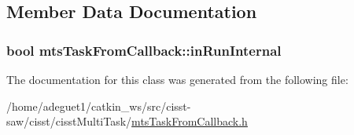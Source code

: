 \subsection{Member Data Documentation}
\hypertarget{classmts_task_from_callback_ab39ba4bafd286ab8fffbbee89de845f6}{
\subsubsection[{in\-Run\-Internal}]{\setlength{\rightskip}{0pt plus 5cm}bool mts\-Task\-From\-Callback\-::in\-Run\-Internal\hspace{0.3cm}{\ttfamily [protected]}}}\label{classmts_task_from_callback_ab39ba4bafd286ab8fffbbee89de845f6}


The documentation for this class was generated from the following file\-:\begin{DoxyCompactItemize}
\item 
/home/adeguet1/catkin\-\_\-ws/src/cisst-\/saw/cisst/cisst\-Multi\-Task/\hyperlink{mts_task_from_callback_8h}{mts\-Task\-From\-Callback.\-h}\end{DoxyCompactItemize}
